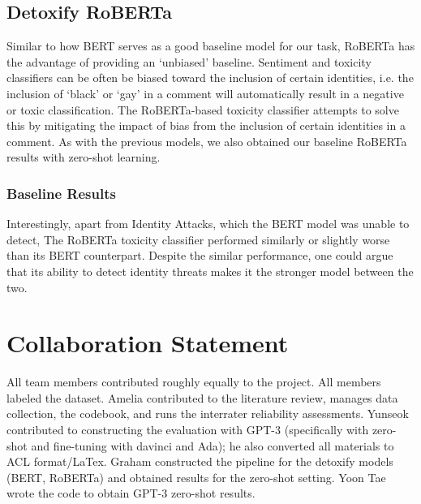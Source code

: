 \documentclass[11pt]{article}
\begin{document}
\subsection{Detoxify RoBERTa}
Similar to how BERT serves as a good baseline model for our task, RoBERTa has the advantage of providing an ‘unbiased’ baseline.  Sentiment and toxicity classifiers can be often be biased toward the inclusion of certain identities, i.e. the inclusion of ‘black’ or ‘gay’ in a comment will automatically result in a negative or toxic classification.  The RoBERTa-based toxicity classifier attempts to solve this by mitigating the impact of bias from the inclusion of certain identities in a comment.  As with the previous models, we also obtained our baseline RoBERTa results with zero-shot learning.

\subsubsection{Baseline Results}
Interestingly, apart from Identity Attacks, which the BERT model was unable to detect, The RoBERTa toxicity classifier performed similarly or slightly worse than its BERT counterpart.  Despite the similar performance, one could argue that its ability to detect identity threats makes it the stronger model between the two.

\section{Collaboration Statement}
All team members contributed roughly equally to the project. All members labeled the dataset. Amelia contributed to the literature review, manages data collection, the codebook, and runs the interrater reliability assessments. Yunseok contributed to constructing the evaluation with GPT-3 (specifically with zero-shot and fine-tuning with davinci and Ada); he also converted all materials to ACL format/LaTex. Graham constructed the pipeline for the detoxify models (BERT,  RoBERTa) and obtained results for the zero-shot setting. Yoon Tae wrote the code to obtain GPT-3 zero-shot results.






\newpage

\appendix
\onecolumn
\end{document}
